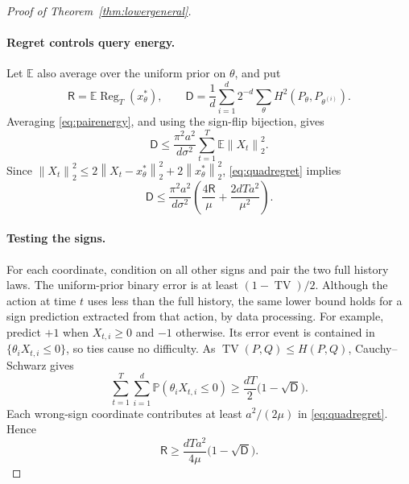 \documentclass[11pt]{article}
\numberwithin{equation}{section}
\newcommand{\E}{\mathbb E}
\newcommand{\Pp}{\mathbb P}
\newcommand{\Reg}{\operatorname{Reg}}
\newcommand{\TV}{\operatorname{TV}}
\newcommand{\norm}[1]{\left\|#1\right\|}
\theoremstyle{definition}
\theoremstyle{remark}
\begin{document}
\begin{proof}[Proof of Theorem~\ref{thm:lowergeneral}]
\paragraph{Regret controls query energy.}
Let $\E$ also average over the uniform prior on $\theta$, and put
\[
 \mathsf R=\E\Reg_T(x_\theta^*),\qquad
 \mathsf D=\frac1d\sum_{i=1}^d2^{-d}\sum_\theta
                    H^2(P_\theta,P_{\theta^{(i)}}).
\]
Averaging \eqref{eq:pairenergy}, and using the sign-flip bijection, gives
\[
 \mathsf D\leq\frac{\pi^2a^2}{d\sigma^2}
                     \sum_{t=1}^T\E\norm{X_t}_2^2.
\]
Since $\norm{X_t}_2^2\leq2\norm{X_t-x_\theta^*}_2^2
+2\norm{x_\theta^*}_2^2$, \eqref{eq:quadregret} implies
\begin{equation}\label{eq:energyregret}
 \mathsf D\leq\frac{\pi^2a^2}{d\sigma^2}
       \left(\frac{4\mathsf R}{\mu}
                          +\frac{2dTa^2}{\mu^2}\right).
\end{equation}

\paragraph{Testing the signs.}
For each coordinate, condition on all other signs and pair the two full
history laws. The uniform-prior binary error is at least $(1-\TV)/2$.
Although the action at time $t$ uses less than the full history, the same
lower bound holds for a sign prediction extracted from that action, by data
processing. For example, predict $+1$ when $X_{t,i}\geq0$ and $-1$ otherwise.
Its error event is contained in $\{\theta_iX_{t,i}\leq0\}$, so ties
cause no difficulty. As $\TV(P,Q)\leq H(P,Q)$, Cauchy--Schwarz gives
\begin{equation}\label{eq:signsum}
 \sum_{t=1}^T\sum_{i=1}^d\Pp(\theta_iX_{t,i}\leq0)
 \geq\frac{dT}{2}\bigl(1-\sqrt{\mathsf D}\bigr).
\end{equation}
Each wrong-sign coordinate contributes at least $a^2/(2\mu)$ in
\eqref{eq:quadregret}. Hence
\begin{equation}\label{eq:testingregret}
 \mathsf R\geq\frac{dTa^2}{4\mu}\bigl(1-\sqrt{\mathsf D}\bigr).
\end{equation}


\end{proof}
\end{document}
